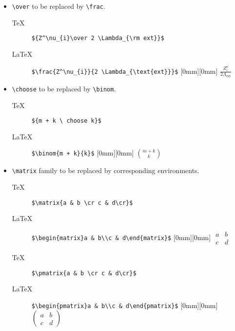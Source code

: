\documentclass{cernphprep}
\begin{document}
\begin{itemize}
\item \verb!\over! to be replaced by \verb!\frac!.
\begin{description}
\item[\TeX{}] \verb!${Z^\nu_{i}\over 2 \Lambda_{\rm ext}}$!
\item[\LaTeX] \verb!$\frac{Z^\nu_{i}}{2 \Lambda_{\text{ext}}}$!%
   \hfill\raisebox{1em}[0mm][0mm]{%
       $\displaystyle\frac{Z^\nu_{i}}{2 \Lambda_{\text{ext}}}$}
\end{description}
\item \verb!\choose! to be replaced by \verb!\binom!.
\begin{description}
\item[\TeX{}] \verb!${m + k \ choose k}$!
\item[\LaTeX] \verb!$\binom{m + k}{k}$!%
   \hfill\raisebox{1em}[0mm][0mm]{%
       $\displaystyle\binom{m + k}{k}$}
\end{description}
\item \verb!\matrix! family to be replaced by corresponding environments.
\begin{description}
\item[\TeX{}] \verb!$\matrix{a & b \cr c & d\cr}$!
\item[\LaTeX] \verb!$\begin{matrix}a & b\\c & d\end{matrix}$!%
   \hfill\raisebox{1em}[0mm][0mm]{%
       $\displaystyle\begin{matrix}a & b\\c & d\end{matrix}$}
\item[\TeX{}] \verb!$\pmatrix{a & b \cr c & d\cr}$!
\item[\LaTeX] \verb!$\begin{pmatrix}a & b\\c & d\end{pmatrix}$!%
   \hfill\raisebox{1em}[0mm][0mm]{%
       $\displaystyle\begin{pmatrix}a & b\\c & d\end{pmatrix}$}

\end{description}
\end{itemize}
\end{document}
